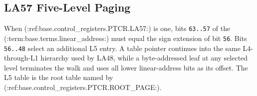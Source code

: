 \subsection{LA57 Five-Level Paging}

When (:ref:base.control_registers.PTCR.LA57:) is one, bits \texttt{63..57} of the (:term:base.terms.linear_address:) must equal the sign extension of bit
\texttt{56}. Bits \texttt{56..48} select an additional L5 entry. A table pointer continues into the same
L4-through-L1 hierarchy used by LA48, while a byte-addressed leaf at any selected level terminates the walk and uses
all lower linear-address bits as its offset. The L5 table is the root table named by (:ref:base.control_registers.PTCR.ROOT_PAGE:).



